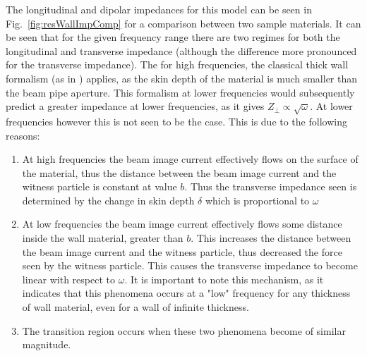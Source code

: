 The longitudinal and dipolar impedances for this model can be seen in Fig.~\ref{fig:resWallImpComp} for a comparison between two sample materials. It can be seen that for the given frequency range there are two regimes for both the longitudinal and transverse impedance (although the difference more pronounced for the transverse impedance). The for high frequencies, the classical thick wall formalism (as in \cite{Chao:PhysColEff}) applies, as the skin depth of the material is much smaller than the beam pipe aperture. This formalism at lower frequencies would subsequently predict a greater impedance at lower frequencies, as it gives $Z_{\perp} \propto \sqrt{\omega}$. At lower frequencies however this is not seen to be the case. This is due to the following reasons:

\begin{enumerate}
\item{At high frequencies the beam image current effectively flows on the surface of the material, thus the distance between the beam image current and the witness particle is constant at value $b$. Thus the transverse impedance seen is determined by the change in skin depth $\delta$ which is proportional to $\omega$}
\item{At low frequencies the beam image current effectively flows some distance inside the wall material, greater than $b$. This increases the distance between the beam image current and the witness particle, thus decreased the force seen by the witness particle. This causes the transverse impedance to become linear with respect to $\omega$. It is important to note this mechanism, as it indicates that this phenomena occurs at a "low" frequency for any thickness of wall material, even for a wall of infinite thickness.}
\item{The transition region occurs when these two phenomena become of similar magnitude.}
\end{enumerate}

